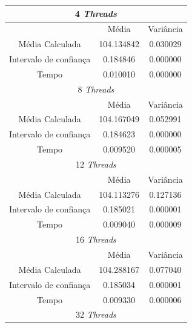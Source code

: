 \documentclass[11pt,twoside]{article}
\begin{document}
        \begin{table}[ht]
        \centering
            \begin{tabular}{|c|c|c|}
            \hline
            
            \multicolumn{3}{|c|}{ 4 {\it Threads} } \\ \hline
            
             & Média & Variância \\ \hline
            Média Calculada & 104.134842 & 0.030029 \\ \hline
            Intervalo de confiança & 0.184846 & 0.000000\\ \hline
            Tempo & 0.010010 & 0.000000 \\ \hline
            
            \multicolumn{3}{|c|}{ 8 {\it Threads} } \\ \hline
            
             & Média & Variância \\ \hline
            Média Calculada & 104.167049 & 0.052991 \\ \hline
            Intervalo de confiança & 0.184623 & 0.000000\\ \hline
            Tempo & 0.009520 & 0.000005 \\ \hline
            
            \multicolumn{3}{|c|}{ 12 {\it Threads} } \\ \hline
            
             & Média & Variância \\ \hline
            Média Calculada & 104.113276 & 0.127136 \\ \hline
            Intervalo de confiança & 0.185021 & 0.000001\\ \hline
            Tempo & 0.009040 & 0.000009 \\ \hline
            
            \multicolumn{3}{|c|}{ 16 {\it Threads} } \\ \hline
            
             & Média & Variância \\ \hline
            Média Calculada & 104.288167 & 0.077040 \\ \hline
            Intervalo de confiança & 0.185034 & 0.000001\\ \hline
            Tempo & 0.009330 & 0.000006 \\ \hline
            
            \multicolumn{3}{|c|}{ 32 {\it Threads} } \\ \hline
            

\end{tabular}
\end{table}
\end{document}
